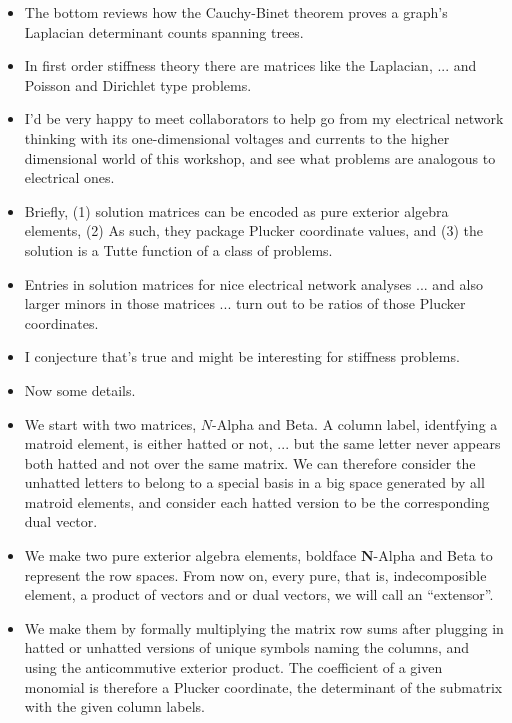\documentclass[14pt]{extarticle}
\begin{document}
{\bf
  \begin{itemize}

  \item The bottom reviews how the Cauchy-Binet theorem proves a graph's Laplacian
    determinant counts spanning trees.

  \item In first order stiffness theory
    there are matrices like the Laplacian, ...
      and Poisson and Dirichlet type problems.

  \item I'd be very happy to meet collaborators to help go from my electrical network
    thinking with its one-dimensional voltages and currents to the higher dimensional
    world of this workshop, and see what problems are analogous to electrical ones.

  \item Briefly,  (1) solution matrices can be encoded as pure exterior algebra elements, (2) As such,
    they package Plucker coordinate values, and (3) the solution is a Tutte function of a class
    of problems.

  \item
    Entries in solution matrices for nice electrical network analyses ... and also larger minors
    in those matrices ... turn out to be ratios of those Plucker coordinates. 

    \item I conjecture that's true and might be interesting for stiffness problems.
    
  \item Now some details.
      
  \item We start with two matrices, $N$-Alpha and Beta.  A column label, identfying
    a matroid element, is either hatted or not, ... but the same letter never appears
    both hatted and not over the same matrix.  We can therefore consider the unhatted letters to
    belong to a special basis in a big space generated by all matroid elements, and consider
    each hatted version to be the corresponding dual vector.

  \item We make two pure exterior algebra elements,  boldface
    $\mathbf{N}$-Alpha and Beta to represent the row spaces.  From now on, every pure, that is,
    indecomposible element, 
    a product of vectors and or dual vectors, we will call an ``extensor''.  

  \item We make them by formally multiplying the matrix row sums after plugging
    in hatted or unhatted versions of unique symbols naming the columns, and using
    the anticommutive exterior product.   The coefficient of a given monomial is therefore
    a Plucker coordinate, the determinant of the submatrix with the given column
    labels.


\end{itemize}}
\end{document}
